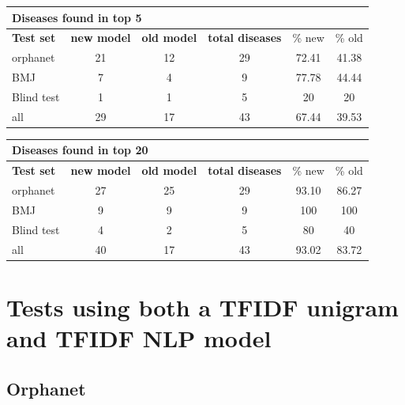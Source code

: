 \documentclass[10pt,letterpaper,final]{article}
\begin{document}
\begin{center}
\begin{small}
\begin{tabular}{l|cc||ccc}
	\multicolumn{6}{l}{\textbf{Diseases found in top 5}} \\ \hline
\textbf{Test set} & \textbf{new model} &	\textbf{old model}	 &	\textbf{total diseases} &	\% new	 &\% old \\ \hline
orphanet    &    21   &  12    & 29      & 72.41     & 41.38 \\
BMJ	        &    7   &   4   &    9   &  77.78    & 44.44 \\
Blind test	&   1    &   1   &    5   &   20   & 20 \\ \hline \hline
all	        &   29    &   17   &   43    &  67.44    & 39.53 \\ \hline
\end{tabular}
\end{small}
\end{center}

\begin{center}
\begin{small}
\begin{tabular}{l|cc||ccc}
	\multicolumn{6}{l}{\textbf{Diseases found in top 20}} \\ \hline
\textbf{Test set} & \textbf{new model} &	\textbf{old model}	 &	\textbf{total diseases} &	\% new	 &\% old \\ \hline
orphanet    &    27   &   25   &  29     &  93.10    & 86.27\\
BMJ	        &     9  &   9   &    9   &    100  & 100 \\
Blind test	&     4  &   2   &    5   &    80  & 40 \\ \hline \hline
all	        &    40   & 17     &   43    &   93.02   &  83.72 \\ \hline
\end{tabular}
\end{small}
\end{center}


\newpage
\section{Tests using both a TFIDF unigram and TFIDF NLP model}

\subsection{Orphanet}
\end{document}
